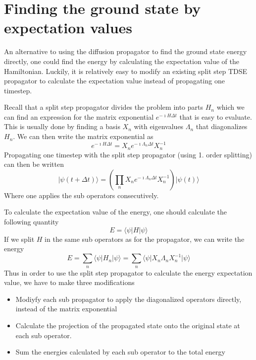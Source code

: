 \documentclass[a4paper,10pt]{article}
\newcommand{\bra}[1]{\langle #1 \vert}
\newcommand{\ket}[1]{\ensuremath{\vert #1 \rangle}}
\begin{document}
\section{Finding the ground state by expectation values}
An alternative to using the diffusion propagator to find the ground state energy directly, one
could find the energy by calculating the expectation value of the Hamiltonian. Luckily, it is
relatively easy to modify an existing split step TDSE propagator to calculate the expectation 
value instead of propagating one timestep. 

Recall that a split step propagator divides the problem into parts $H_n$ which we can find an expression
for the matrix exponential $e^{- \imath H \Delta t}$ that is easy to evaluate. This is usually done by 
finding a basis $X_n$ with eigenvalues $\Lambda_n$ that diagonalizes $H_n$. We can then write the 
matrix exponential as
\begin{equation}
	e^{- \imath H \Delta t} = X_n e^{- \imath \Lambda_n \Delta t} X_n^{-1}
\end{equation}
Propagating one timestep with the split step propagator (using 1. order splitting) can then be written
\begin{equation}
	\ket{\psi(t + \Delta t)} = \left ( \prod_{n} X_n e^{- \imath \Lambda_n \Delta t} X_n^{-1} \right ) \ket{\psi(t)} 
\end{equation}
Where one applies the sub operators consecutively. 

To calculate the expectation value of the energy, one should calculate the following quantity
\begin{equation}
	E = \bra{\psi} H \ket{\psi}
\end{equation}
If we split $H$ in the same sub operators as for the propagator, we can write the energy
\begin{equation}
	E = \sum_n \bra{\psi} H_n \ket{\psi} = \sum_n \bra{\psi} X_n \Lambda_n X_n^{-1} \ket{\psi}
\end{equation}
Thus in order to use the split step propagator to calculate the energy expectation value, we have to make
three modifications

\begin{itemize}
\item Modiyfy each sub propagator to apply the diagonalized operators directly, instead
of the matrix exponential
\item Calculate the projection of the propagated state onto the original state at each sub operator.
\item Sum the energies calculated by each sub operator to the total energy
\end{itemize}
\end{document}
